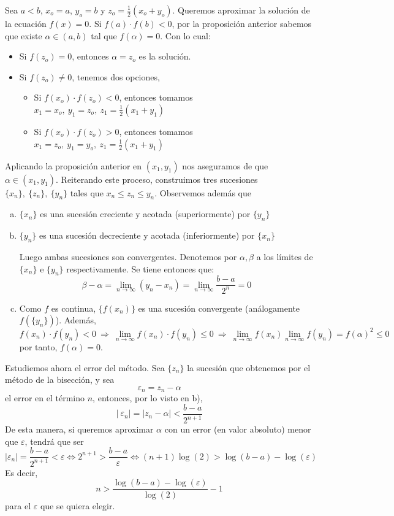 \begin{met}
Sea $a<b$, $x_o=a$,  $y_o=b$ y $z_o=\frac{1}{2}(x_o+y_o)$. Queremos aproximar la solución de la ecuación $f(x)=0$. Si $f(a)\cdot f(b)<0$, por la proposición anterior sabemos que existe $\alpha\in(a,b)$ tal que $f(\alpha)=0$. Con lo cual: \vspace{-5mm}
\begin{itemize}
\item Si $f(z_o)=0$, entonces $\alpha=z_o$ es la solución.
\item Si $f(z_o) \neq 0$, tenemos dos opciones,
\begin{itemize}
    \item Si $f(x_o) \cdot f(z_o) < 0$, entonces tomamos $x_1=x_o, \: y_1=z_o,\: z_1=\frac{1}{2}(x_1+y_1)$
    \item Si $f(x_o) \cdot f(z_o)>0$, entonces tomamos $x_1=z_o, \: y_1=y_o,\: z_1=\frac{1}{2}(x_1+y_1)$
\end{itemize}
\end{itemize}
Aplicando la proposición anterior en $(x_1,y_1)$ nos aseguramos de que $\alpha\in(x_1,y_1)$. Reiterando este proceso, construimos tres sucesiones $\{x_n\}, \: \{z_n\}, \: \{y_n\}$ tales que $x_n\leq z_n\leq y_n$. Observemos además que
\begin{enumerate}[a)]
    \item $\{x_n\}$ es una sucesión creciente y acotada (superiormente) por $\{y_n\}$ 
    
    \item $\{y_n\}$ es una sucesión decreciente y acotada (inferiormente) por $\{x_n\}$

Luego ambas sucesiones son convergentes. Denotemos por $\alpha,\beta$ a los límites de $\{x_n\}$ e $\{y_n\}$ respectivamente. Se tiene entonces que:
$$\beta-\alpha=\underset{n\to\infty}{\lim}(y_n-x_n)=\underset{n\to\infty}{\lim}\frac{b-a}{2^n}=0$$
\item  Como $f$ es continua, $\{f(x_n)\}$ es una sucesión convergente (análogamente $f(\{y_n\})$). Además,  \vspace{-3mm}
$$f(x_n) \cdot f(y_n) <0 \: \Rightarrow \:  \lim_{n \to \infty} f(x_n) \cdot f(y_n) \leq 0 \: \Rightarrow \: \lim_{n \to \infty} f(x_n)  \lim_{n \to \infty} f(y_n) =f(\alpha)^2\leq 0$$
por tanto, $f(\alpha)=0.$
\end{enumerate}
Estudiemos ahora el error del método. Sea $\{z_n\}$ la sucesión que obtenemos por el método de la bisección, y sea 
$$\varepsilon_n=z_n - \alpha$$
el error en el término $n$, entonces, por lo visto en b),
$$|\: \varepsilon_n|=|z_n - \alpha|< \dfrac{b-a}{2^{n+1}}$$
De esta manera, si queremos aproximar $\alpha$ con un error (en valor absoluto) menor que $\varepsilon$, tendrá que ser 
$$|\varepsilon_n|=\dfrac{b-a}{2^{n+1}} < \varepsilon \iff 2^{n+1} > \dfrac{b-a}{\varepsilon} \iff (n+1) \log(2) > \log(b-a) - \log(\varepsilon) $$
Es decir, $$n > \dfrac{\log(b-a)-\log(\varepsilon)}{\log(2)}-1$$
para el $\varepsilon$ que se quiera elegir.
\end{met}
